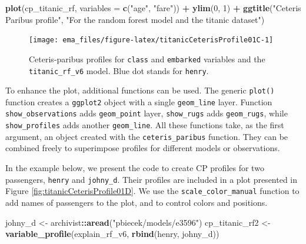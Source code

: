 \documentclass[]{krantz}
\newenvironment{Shaded}{\begin{snugshade}}{\end{snugshade}}
\newcommand{\DataTypeTok}[1]{\textcolor[rgb]{0.13,0.29,0.53}{#1}}
\newcommand{\DecValTok}[1]{\textcolor[rgb]{0.00,0.00,0.81}{#1}}
\newcommand{\KeywordTok}[1]{\textcolor[rgb]{0.13,0.29,0.53}{\textbf{#1}}}
\newcommand{\NormalTok}[1]{#1}
\newcommand{\OperatorTok}[1]{\textcolor[rgb]{0.81,0.36,0.00}{\textbf{#1}}}
\newcommand{\StringTok}[1]{\textcolor[rgb]{0.31,0.60,0.02}{#1}}
\begin{document}
\begin{Shaded}
\begin{Highlighting}[]
\KeywordTok{plot}\NormalTok{(cp_titanic_rf, }\DataTypeTok{variables =} \KeywordTok{c}\NormalTok{(}\StringTok{"age"}\NormalTok{, }\StringTok{"fare"}\NormalTok{)) }\OperatorTok{+}\StringTok{ }
\StringTok{  }\KeywordTok{ylim}\NormalTok{(}\DecValTok{0}\NormalTok{, }\DecValTok{1}\NormalTok{) }\OperatorTok{+}
\StringTok{  }\KeywordTok{ggtitle}\NormalTok{(}\StringTok{"Ceteris Paribus profile"}\NormalTok{, }
          \StringTok{"For the random forest model and the titanic dataset"}\NormalTok{)}
\end{Highlighting}
\end{Shaded}

\begin{figure}

{\centering \texttt{[image: ema\_files/figure-latex/titanicCeterisProfile01C-1]} 

}

\caption{Ceteris-paribus profiles for \texttt{class} and \texttt{embarked} variables and the \texttt{titanic\_rf\_v6} model. Blue dot stands for \texttt{henry}.}\label{fig:titanicCeterisProfile01C}
\end{figure}

To enhance the plot, additional functions can be used. The generic \texttt{plot()} function creates a \texttt{ggplot2} object with a single \texttt{geom\_line} layer. Function \texttt{show\_observations} adds \texttt{geom\_point} layer, \texttt{show\_rugs} adds \texttt{geom\_rugs}, while \texttt{show\_profiles} adds another \texttt{geom\_line}. All these functions take, as the first argument, an object created with the \texttt{ceteris\_paribus} function. They can be combined freely to superimpose profiles for different models or observations.

In the example below, we present the code to create CP profiles for two passengers, \texttt{henry} and \texttt{johny\_d}. Their profiles are included in a plot presented in Figure \ref{fig:titanicCeterisProfile01D}. We use the \texttt{scale\_color\_manual} function to add names of passengers to the plot, and to control colors and positions.

\begin{Shaded}
\begin{Highlighting}[]
\NormalTok{johny_d <-}\StringTok{ }\NormalTok{archivist}\OperatorTok{::}\KeywordTok{aread}\NormalTok{(}\StringTok{"pbiecek/models/e3596"}\NormalTok{)}
\NormalTok{cp_titanic_rf2 <-}\StringTok{ }\KeywordTok{variable_profile}\NormalTok{(explain_rf_v6, }\KeywordTok{rbind}\NormalTok{(henry, johny_d))}
\end{Highlighting}
\end{Shaded}
\end{document}
